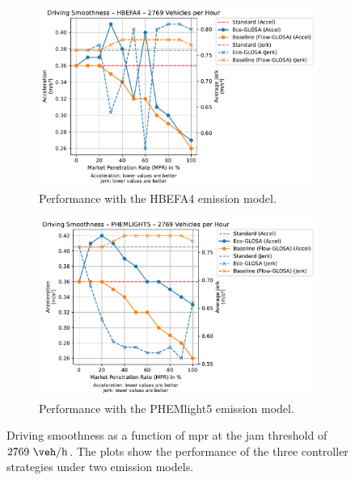 \begin{figure}[htbp]
  \centering
  \begin{subfigure}[b]{0.98\textwidth}
    \includegraphics[width=\textwidth]{data/img/DrivingSmoothness/DrivingSmoothness_HBEFA4_Cars2769.pdf}
    \caption{Performance with the HBEFA4 emission model.}
    \label{fig:Smoothness_HBEFA4_2769}
  \end{subfigure}
  \begin{subfigure}[b]{0.98\textwidth}
    \includegraphics[width=\textwidth]{data/img/DrivingSmoothness/DrivingSmoothness_PHEMLIGHT5_Cars2769.pdf}
    \caption{Performance with the PHEMlight5 emission model.}
    \label{fig:Smoothness_PHEMlight5_2769}
  \end{subfigure}
  \caption[Driving smoothness vs. \ac{mpr} at $2769~\unit{\veh\per\hour}$]{Driving smoothness as a function of \ac{mpr} at the jam threshold of $2769~\unit{\veh\per\hour}$. The plots show the performance of the three controller strategies under two emission models.}
  \label{fig:Smoothness_2769}
\end{figure}

